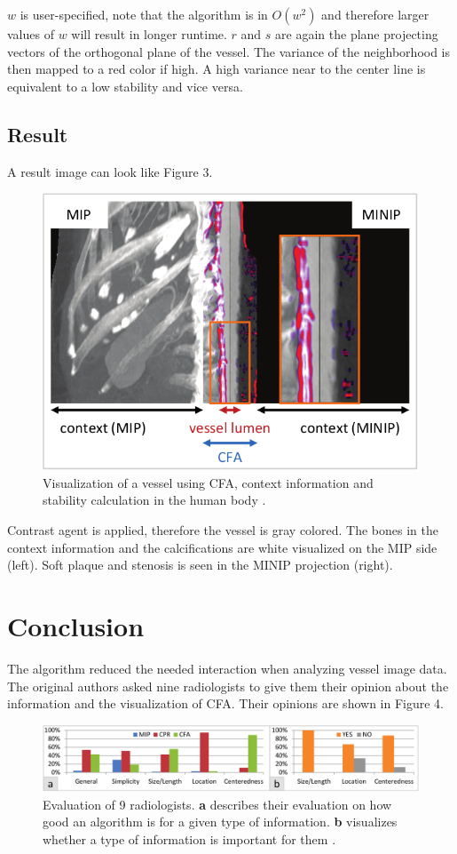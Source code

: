 $w$ is user-specified, note that the algorithm is in $O(w^2)$ and therefore larger values of $w$ will result in longer runtime. $r$ and $s$ are again the plane projecting vectors of the orthogonal plane of the vessel. The variance of the neighborhood is then mapped to a red color if high. A high variance near to the center line is equivalent to a low stability and vice versa.

\subsection{Result}
A result image can look like Figure 3. 
\begin{figure}
	\includegraphics[width=\columnwidth]{img/cfaresult}
	\caption{Visualization of a vessel using CFA, context information and stability calculation in the human body \cite{Mistelbauer2013}.}
\end{figure}
Contrast agent is applied, therefore the vessel is gray colored. The bones in the context information and the calcifications are white visualized on the MIP side (left). Soft plaque and stenosis is seen in the MINIP projection (right).

\section{Conclusion}
The algorithm reduced the needed interaction when analyzing vessel image data. The original authors asked nine radiologists to give them their opinion about the information and the visualization of CFA. Their opinions are shown in Figure 4.
\begin{figure}
	\includegraphics[width=\columnwidth]{img/cfaeval}
	\caption{Evaluation of 9 radiologists. \textbf{a} describes their evaluation on how good an algorithm is for a given type of information. \textbf{b} visualizes whether a type of information is important for them \cite{Mistelbauer2013}.}
\end{figure}

